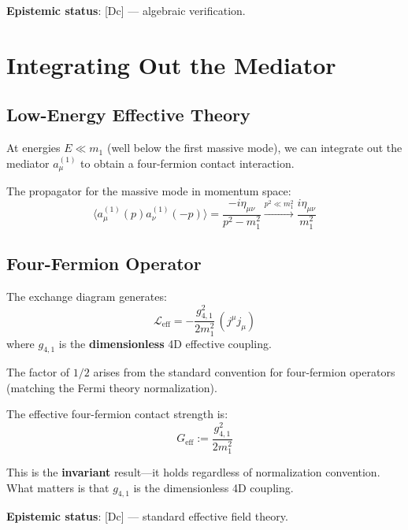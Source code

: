 \textbf{Epistemic status}: [Dc] --- algebraic verification.


\section{Integrating Out the Mediator}
\label{sec:ch19_integrate_out}

\subsection{Low-Energy Effective Theory}

At energies $E \ll m_1$ (well below the first massive mode), we can integrate out
the mediator $a_\mu^{(1)}$ to obtain a four-fermion contact interaction.

The propagator for the massive mode in momentum space:
\begin{equation}
    \langle a_\mu^{(1)}(p) a_\nu^{(1)}(-p) \rangle = \frac{-i \eta_{\mu\nu}}{p^2 - m_1^2}
    \xrightarrow{p^2 \ll m_1^2} \frac{i \eta_{\mu\nu}}{m_1^2}
    \label{eq:ch19_propagator}
\end{equation}

\subsection{Four-Fermion Operator}

The exchange diagram generates:
\begin{equation}
    \mathcal{L}_{\text{eff}} = -\frac{g_{4,1}^2}{2 m_1^2} \, (j^\mu j_\mu)
    \label{eq:ch19_leff}
\end{equation}
where $g_{4,1}$ is the \textbf{dimensionless} 4D effective coupling.

The factor of $1/2$ arises from the standard convention for four-fermion operators
(matching the Fermi theory normalization).

\begin{tcolorbox}[colback=orange!5!white, colframe=orange!50!black,
    title=\textbf{Key Result: Invariant EFT Formula}]

The effective four-fermion contact strength is:
\begin{equation}
    \boxed{G_{\text{eff}} := \frac{g_{4,1}^2}{2 m_1^2}}
    \label{eq:ch19_geff_def}
\end{equation}

This is the \textbf{invariant} result---it holds regardless of normalization convention.
What matters is that $g_{4,1}$ is the dimensionless 4D coupling.

\textbf{Epistemic status}: [Dc] --- standard effective field theory.

\end{tcolorbox}

